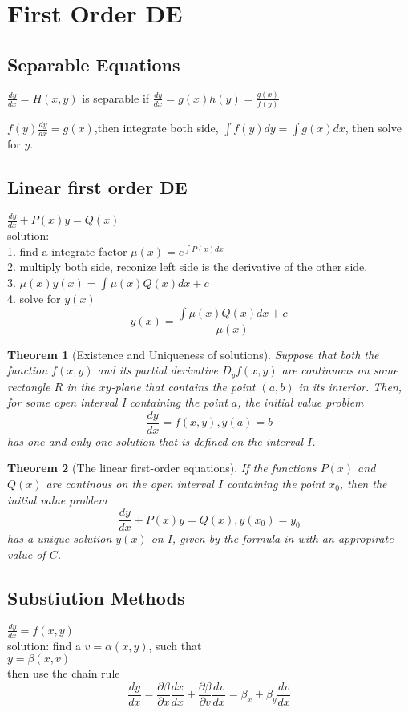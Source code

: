 \documentclass[letter]{article}
\begin{document}
\section{First Order DE}
\subsection{Separable Equations}
$\frac{dy}{dx} = H(x,y)$ is separable if $\frac{dy}{dx} = g(x)h(y) = \frac{g(x)}{f(y)}$

$f(y)\frac{dy}{dx} = g(x)$,then integrate both side, $\int{f(y) dy} = \int{g(x) dx}$, then solve for $y$.


\subsection{Linear first order DE}
$\frac{dy}{dx} + P(x) y = Q(x)$
\\
solution:\\
1. find a integrate factor $\mu(x) = e^{\int P(x) dx}$\\
2. multiply both side, reconize left side is the derivative of the other side.\\
3. $\mu(x)y(x) = \int{\mu(x)Q(x)dx} + c$\\
4. solve for $y(x)$\\

\[
y(x) = \frac{\int{\mu(x) Q(x) dx} + c}{\mu(x)}
\]

\newtheorem{thm}{Theorem}
\begin{thm}[Existence and Uniqueness of solutions]
Suppose that both the function $f(x,y)$ and its partial derivative $D_yf(x,y)$ are continuous on some rectangle $R$ in the $xy$-plane that contains the point $(a,b)$ in its interior. Then, for some open interval I containing the point $a$, the initial value problem
\[
\frac{dy}{dx} = f(x,y), y(a) = b
\]
has one and only one solution that is defined on the interval $I$.
\end{thm} 

\begin{thm}[The linear first-order equations]
If the functions $P(x)$ and $Q(x)$ are continous on the open interval $I$ containing the point $x_0$, then the initial value problem
\[
\frac{dy}{dx} + P(x)y = Q(x) , y(x_0) = y_0
\]
has a unique solution $y(x)$ on $I$, given by the formula in with an appropirate value of $C$.
\end{thm}
 
\subsection{Substiution Methods}
$\frac{dy}{dx} = f(x,y)$\\
solution: find a $v = \alpha(x,y)$, such that\\
$y = \beta(x,v)$\\
then use the chain rule\\
\[\frac{dy}{dx} = \frac{\partial \beta}{\partial x}\frac{dx}{dx} + \frac{\partial \beta}{\partial v} \frac{dv}{dx} = \beta_x + \beta_y\frac{dv}{dx}\]
\end{document}
